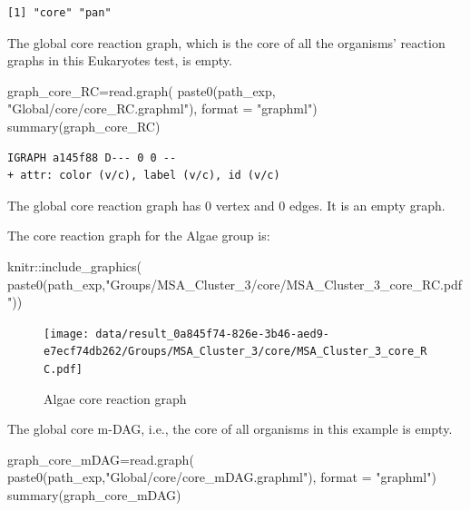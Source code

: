 \documentclass[
  letterpaper,
  DIV=11,
  numbers=noendperiod]{scrreprt}
\newenvironment{Shaded}{}{}
\newcommand{\AttributeTok}[1]{\textcolor[rgb]{0.78,0.47,0.87}{#1}}
\newcommand{\FunctionTok}[1]{\textcolor[rgb]{0.38,0.69,0.94}{#1}}
\newcommand{\NormalTok}[1]{\textcolor[rgb]{0.67,0.70,0.75}{#1}}
\newcommand{\OtherTok}[1]{\textcolor[rgb]{0.15,0.68,0.38}{#1}}
\newcommand{\SpecialCharTok}[1]{\textcolor[rgb]{0.34,0.71,0.76}{#1}}
\newcommand{\StringTok}[1]{\textcolor[rgb]{0.60,0.76,0.47}{#1}}
\begin{document}
\begin{verbatim}
[1] "core" "pan" 
\end{verbatim}

The global core reaction graph, which is the core of all the organisms'
reaction graphs in this Eukaryotes test, is empty.

\begin{Shaded}
\begin{Highlighting}[]
\NormalTok{graph\_core\_RC}\OtherTok{=}\FunctionTok{read.graph}\NormalTok{(}
  \FunctionTok{paste0}\NormalTok{(path\_exp,}
         \StringTok{"Global/core/core\_RC.graphml"}\NormalTok{),}
  \AttributeTok{format =} \StringTok{"graphml"}\NormalTok{)}
\FunctionTok{summary}\NormalTok{(graph\_core\_RC)}
\end{Highlighting}
\end{Shaded}

\begin{verbatim}
IGRAPH a145f88 D--- 0 0 -- 
+ attr: color (v/c), label (v/c), id (v/c)
\end{verbatim}

The global core reaction graph has 0 vertex and 0 edges. It is an empty
graph.

The core reaction graph for the Algae group is:

\begin{Shaded}
\begin{Highlighting}[]
\NormalTok{knitr}\SpecialCharTok{::}\FunctionTok{include\_graphics}\NormalTok{(}
  \FunctionTok{paste0}\NormalTok{(path\_exp,}\StringTok{"Groups/MSA\_Cluster\_3/core/MSA\_Cluster\_3\_core\_RC.pdf"}\NormalTok{))}
\end{Highlighting}
\end{Shaded}

\begin{figure}[H]

{\centering \texttt{[image: data/result\_0a845f74-826e-3b46-aed9-e7ecf74db262/Groups/MSA\_Cluster\_3/core/MSA\_Cluster\_3\_core\_RC.pdf]}

}

\caption{Algae core reaction graph}

\end{figure}

The global core m-DAG, i.e., the core of all organisms in this example
is empty.

\begin{Shaded}
\begin{Highlighting}[]
\NormalTok{graph\_core\_mDAG}\OtherTok{=}\FunctionTok{read.graph}\NormalTok{(}
  \FunctionTok{paste0}\NormalTok{(path\_exp,}\StringTok{"Global/core/core\_mDAG.graphml"}\NormalTok{),}
  \AttributeTok{format =} \StringTok{"graphml"}\NormalTok{)}
\FunctionTok{summary}\NormalTok{(graph\_core\_mDAG)}
\end{Highlighting}
\end{Shaded}
\end{document}
